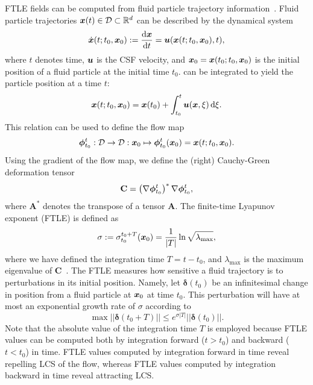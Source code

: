 \documentclass{template}
\begin{document}
FTLE fields can be computed from fluid particle trajectory information~\citep{shadden2005definition}.
Fluid particle trajectories $\bm{x}(t)\in\mathcal{D}\subset\mathbb{R}^d$
can be described by the dynamical system
\begin{equation}
    \dot{\bm{x}}(t; t_0, \bm{x}_0) := \frac{\mathrm d\bm{x}}{\mathrm d t} = \bm{u}(\bm{x}(t; t_0, \bm{x}_0), t),
    \label{eq:dx_dt_equals_u}
\end{equation}
where $t$ denotes time, $\bm{u}$ is the CSF velocity, and $\bm{x}_0=\bm{x}(t_0; t_0, \bm{x}_0)$
is the initial position of a fluid particle at the initial time $t_0$. 
 can be integrated to yield the particle position at a time
$t$:
\begin{equation}
    \bm{x}(t; t_0, \bm{x}_0) = \bm{x}(t_0) + \int_{t_0}^t \bm{u}(\bm{x}, \xi)\,\mathrm d\xi.
    \label{eq:integrate_dx_dt}
\end{equation}
This relation can be used to define the flow map
\begin{equation}
    \bm{\phi}_{t_0}^t : \mathcal{D} \rightarrow \mathcal{D} : \bm{x}_0 \mapsto \bm{\phi}_{t_0}^t(\bm{x}_0) = \bm{x}(t; t_0, \bm{x}_0).
\end{equation}
Using the gradient of the flow map,
we define the (right) Cauchy-Green deformation tensor
\begin{equation}
    \mathbf{C} = \left(\nabla\bm{\phi}_{t_0}^t\right)^*\nabla\bm{\phi}_{t_0}^t,
\end{equation}
where $\mathbf{A}^*$ denotes the transpose of a tensor $\mathbf{A}$.
The finite-time Lyapunov exponent (FTLE) is defined as
\begin{equation}
    \sigma:=\sigma_{t_0}^{t_0+T}(\bm{x}_0) = \frac{1}{\vert T\vert}\ln{\sqrt{\lambda_{\mathrm{max}}}},
\end{equation}
where we have defined the integration time $T = t - t_0$, and $\lambda_{\mathrm{max}}$
is the maximum eigenvalue of $\mathbf{C}$~\citep{shadden2005definition}.
The FTLE measures how sensitive a fluid trajectory
is to perturbations in its initial position.
Namely, let $\boldsymbol{\delta}(t_0)$ be an infinitesimal change
in position from a fluid particle at $\bm{x}_0$ at time $t_0$.
This perturbation will have at most an exponential growth
rate of $\sigma$ according to~\citep{shadden2008characterization}
\begin{equation}
    \max||\boldsymbol{\delta}(t_0 + T)||
    \leq e^{\sigma |T|}||\boldsymbol{\delta}(t_0)||.
\end{equation}
Note that the absolute value of the integration time $T$
is employed because FTLE values can be computed
both by integration forward ($t>t_0$) and backward ($t<t_0$) in time.
FTLE values computed by integration forward in time
reveal repelling LCS of the flow,
whereas FTLE values computed by integration backward in time 
reveal attracting LCS. 
\end{document}
